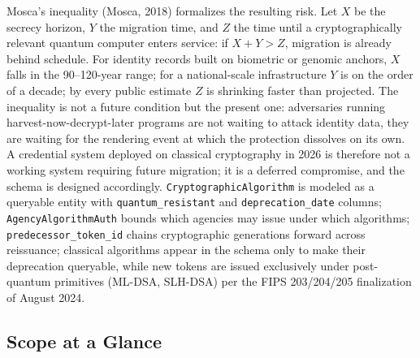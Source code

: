 \documentclass[11pt,letterpaper]{article}
\newcommand{\entity}[1]{\texttt{\color{navydark}#1}}
\begin{document}
Mosca's inequality (Mosca, 2018) formalizes the resulting risk. Let $X$ be the secrecy horizon, $Y$ the migration time, and $Z$ the time until a cryptographically relevant quantum computer enters service: if $X + Y > Z$, migration is already behind schedule. For identity records built on biometric or genomic anchors, $X$ falls in the 90--120-year range; for a national-scale infrastructure $Y$ is on the order of a decade; by every public estimate $Z$ is shrinking faster than projected. The inequality is not a future condition but the present one: adversaries running harvest-now-decrypt-later programs are not waiting to attack identity data, they are waiting for the rendering event at which the protection dissolves on its own. A credential system deployed on classical cryptography in 2026 is therefore not a working system requiring future migration; it is a deferred compromise, and the schema is designed accordingly. \entity{CryptographicAlgorithm} is modeled as a queryable entity with \texttt{quantum\_resistant} and \texttt{deprecation\_date} columns; \entity{AgencyAlgorithmAuth} bounds which agencies may issue under which algorithms; \texttt{predecessor\_token\_id} chains cryptographic generations forward across reissuance; classical algorithms appear in the schema only to make their deprecation queryable, while new tokens are issued exclusively under post-quantum primitives (ML-DSA, SLH-DSA) per the FIPS 203/204/205 finalization of August 2024.

\subsection{Scope at a Glance}
\end{document}
